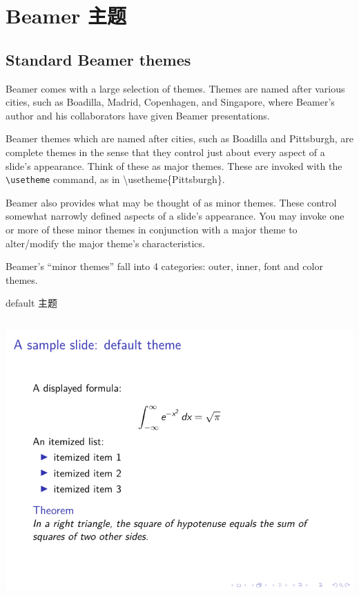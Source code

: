 \begin{column}{0.5\textwidth}
\section{Beamer 主题}

\subsection{Standard Beamer themes}

Beamer comes with a large selection of themes. Themes are named after various cities, such as Boadilla, Madrid, Copenhagen, and Singapore, where Beamer’s author and his collaborators have given Beamer presentations.

Beamer themes which are named after cities, such as Boadilla and Pittsburgh, are complete themes in the sense that they control just about every aspect of a slide’s appearance. Think of these as major themes. These are invoked with the \verb|\usetheme| command, as in {\ttfamily \textbackslash usetheme\{Pittsburgh\}}.

Beamer also provides what may be thought of as minor themes. These control somewhat narrowly defined aspects of a slide’s appearance. You may invoke one or more of these minor themes in conjunction with a major theme to alter/modify the major theme’s characteristics.

Beamer’s “minor themes” fall into 4 categories: outer, inner, font and color themes.

default 主题

\inputminted[linenos=true]{latex}{examples/beamer/beamertheme01.tex}

\includegraphics{examples/beamer/beamertheme01.pdf}


\end{column}
